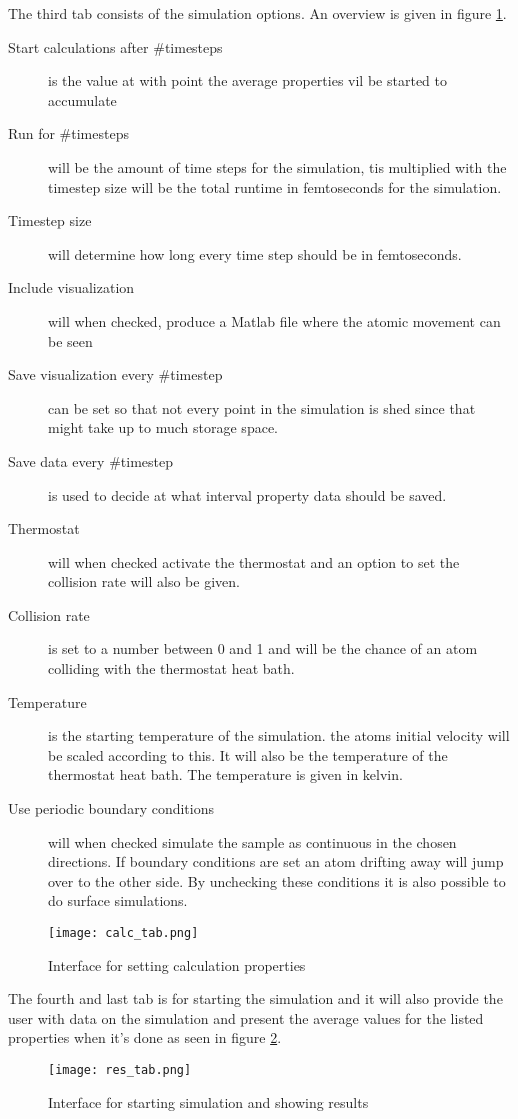 The third tab consists of the simulation options. An overview is given in figure \ref{fig:calc_tab}. 
\begin{description}
	\item[Start calculations after \#timesteps] is the value at with point the average properties vil be started to accumulate
	\item[Run for \#timesteps] will be the amount of time steps for the simulation, tis multiplied with the timestep size will be the total runtime in femtoseconds for the simulation. 
	\item[Timestep size] will determine how long every time step should be in femtoseconds.
	\item[Include visualization] will when checked, produce a Matlab file  where the atomic movement can be seen
	\item[Save visualization every \#timestep] can be set so that not every point in the simulation is shed since that might take up to much storage space.
	\item[Save data every \#timestep] is used to decide at what interval property data should be saved.
	\item[Thermostat] will when checked activate the thermostat and an option to set the collision rate will also be given.
	\item[Collision rate] is set to a number between 0 and 1 and will be the chance of an atom colliding with the thermostat heat bath.
	\item[Temperature] is the starting temperature of the simulation. the atoms initial velocity will be scaled according to this. It will also be the temperature of the thermostat heat bath. The temperature is given in kelvin.
	\item[Use periodic boundary conditions] will when checked simulate the sample as continuous in the chosen directions. If boundary conditions are set an atom drifting away will jump over to the other side. By unchecking these conditions it is also possible to do surface simulations.
\end{description}
\begin{figure}[h!]
	\centering
	\texttt{[image: calc\_tab.png]}
	\caption{Interface for setting calculation properties}
	\label{fig:calc_tab}
\end{figure}
	
The fourth and last tab is for starting the simulation and it will also provide the user with data on the simulation and present the average values for the listed properties when it's done as seen in figure \ref{fig:res_tab}.
\begin{figure}[h!]
	\centering
	\texttt{[image: res\_tab.png]}
	\caption{Interface for starting simulation and showing results}
	\label{fig:res_tab}
\end{figure}

